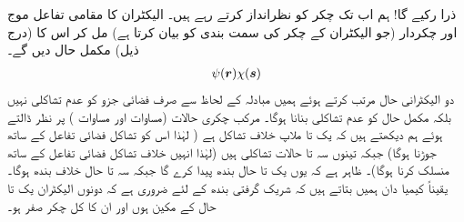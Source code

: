 ذرا رکیے گا! ہم اب تک چکر کو نظرانداز کرتے رہے ہیں۔ الیکٹران کا مقامی تفاعل موج اور چکردار (جو الیکٹران کے چکر کی سمت بندی کو بیان کرتا ہے) مل کر اس کا (درج ذیل) مکمل حال دیں گے۔
\begin{align}
	\psi({{\boldsymbol{r}}})\chi({{\boldsymbol{s}}})
\end{align}
دو الیکٹرانی حال مرتب کرتے ہوئے ہمیں مبادلہ کے لحاظ سے صرف فضائی جزو کو عدم تشاکلی نہیں بلکہ مکمل حال کو عدم تشاکلی بنانا ہوگا۔ مرکب چکری حالات (مساوات  اور مساوات ) پر نظر ڈالتے ہوئے ہم دیکھتے ہیں کہ یک تا ملاپ خلاف تشاکل ہے ( لہٰذا اس کو تشاکل فضائی تفاعل کے ساتھ جوڑنا ہوگا) جبکہ تینوں سہ تا حالات تشاکلی ہیں (لہٰذا انہیں خلاف تشاکل فضائی تفاعل کے ساتھ منسلک کرنا ہوگا)۔ ظاہر ہے کہ یوں یک تا حال بندھ پیدا کرے گا جبکہ سہ تا حال خلاف بندھ ہوگا۔ یقیناً کیمیا دان ہمیں بتاتے ہیں کہ شریک گرفتی بندھ کے لئے ضروری ہے کہ دونوں الیکٹران یک تا حال کے مکین ہوں اور ان کا کل چکر صفر ہو۔


